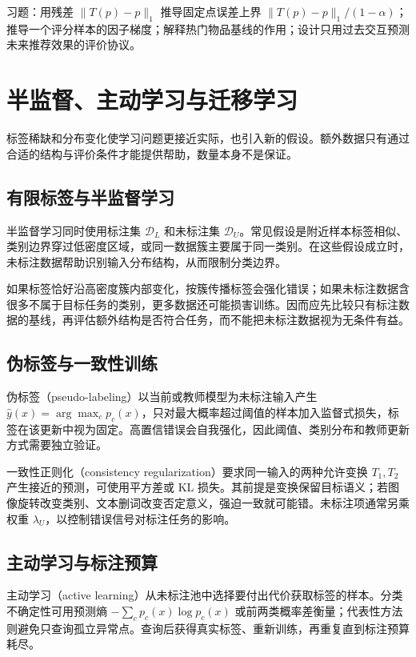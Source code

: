 \documentclass[UTF8,12pt,a4paper,fontset=fandol]{ctexbook}
\begin{document}
习题：用残差 $\|T(p)-p\|_1$ 推导固定点误差上界 $\|T(p)-p\|_1/(1-\alpha)$；推导一个评分样本的因子梯度；解释热门物品基线的作用；设计只用过去交互预测未来推荐效果的评价协议。

\chapter{半监督、主动学习与迁移学习}
\label{chap:ml-transfer}

标签稀缺和分布变化使学习问题更接近实际，也引入新的假设。额外数据只有通过合适的结构与评价条件才能提供帮助，数量本身不是保证。

\section{有限标签与半监督学习}

半监督学习同时使用标注集 $\mathcal D_L$ 和未标注集 $\mathcal D_U$。常见假设是附近样本标签相似、类别边界穿过低密度区域，或同一数据簇主要属于同一类别。在这些假设成立时，未标注数据帮助识别输入分布结构，从而限制分类边界。

如果标签恰好沿高密度簇内部变化，按簇传播标签会强化错误；如果未标注数据含很多不属于目标任务的类别，更多数据还可能损害训练。因而应先比较只有标注数据的基线，再评估额外结构是否符合任务，而不能把未标注数据视为无条件有益。

\section{伪标签与一致性训练}

伪标签（pseudo-labeling）以当前或教师模型为未标注输入产生 $\widehat y(x)=\arg\max_cp_c(x)$，只对最大概率超过阈值的样本加入监督式损失，标签在该更新中视为固定。高置信错误会自我强化，因此阈值、类别分布和教师更新方式需要独立验证。

一致性正则化（consistency regularization）要求同一输入的两种允许变换 $T_1,T_2$ 产生接近的预测，可使用平方差或 KL 损失。其前提是变换保留目标语义；若图像旋转改变类别、文本删词改变否定意义，强迫一致就可能错。未标注项通常另乘权重 $\lambda_U$，以控制错误信号对标注任务的影响。

\section{主动学习与标注预算}

主动学习（active learning）从未标注池中选择要付出代价获取标签的样本。分类不确定性可用预测熵 $-\sum_cp_c(x)\log p_c(x)$ 或前两类概率差衡量；代表性方法则避免只查询孤立异常点。查询后获得真实标签、重新训练，再重复直到标注预算耗尽。
\end{document}
